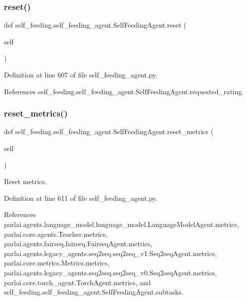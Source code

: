 \subsubsection{\texorpdfstring{reset()}{reset()}}
{\footnotesize\ttfamily def self\+\_\+feeding.\+self\+\_\+feeding\+\_\+agent.\+Self\+Feeding\+Agent.\+reset (\begin{DoxyParamCaption}\item[{}]{self }\end{DoxyParamCaption})}



Definition at line 607 of file self\+\_\+feeding\+\_\+agent.\+py.



References self\+\_\+feeding.\+self\+\_\+feeding\+\_\+agent.\+Self\+Feeding\+Agent.\+requested\+\_\+rating.

\mbox{\label{classself__feeding_1_1self__feeding__agent_1_1SelfFeedingAgent_a2776d1c54e11c170e50add2d20cd2633}} 
\subsubsection{\texorpdfstring{reset\+\_\+metrics()}{reset\_metrics()}}
{\footnotesize\ttfamily def self\+\_\+feeding.\+self\+\_\+feeding\+\_\+agent.\+Self\+Feeding\+Agent.\+reset\+\_\+metrics (\begin{DoxyParamCaption}\item[{}]{self }\end{DoxyParamCaption})}

\begin{DoxyVerb}Reset metrics.\end{DoxyVerb}
 

Definition at line 611 of file self\+\_\+feeding\+\_\+agent.\+py.



References parlai.\+agents.\+language\+\_\+model.\+language\+\_\+model.\+Language\+Model\+Agent.\+metrics, parlai.\+core.\+agents.\+Teacher.\+metrics, parlai.\+agents.\+fairseq.\+fairseq.\+Fairseq\+Agent.\+metrics, parlai.\+agents.\+legacy\+\_\+agents.\+seq2seq.\+seq2seq\+\_\+v1.\+Seq2seq\+Agent.\+metrics, parlai.\+core.\+metrics.\+Metrics.\+metrics, parlai.\+agents.\+legacy\+\_\+agents.\+seq2seq.\+seq2seq\+\_\+v0.\+Seq2seq\+Agent.\+metrics, parlai.\+core.\+torch\+\_\+agent.\+Torch\+Agent.\+metrics, and self\+\_\+feeding.\+self\+\_\+feeding\+\_\+agent.\+Self\+Feeding\+Agent.\+subtasks.

